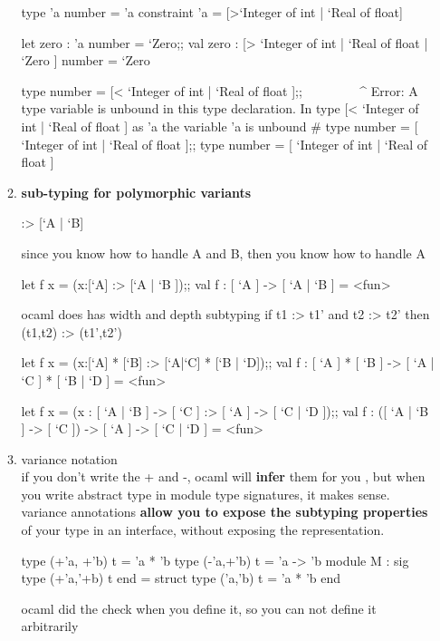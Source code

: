 \begin{enumerate}[(a)]
\begin{enumerate}
\begin{alternate}
type 'a number = 'a constraint 'a = [>`Integer of int | `Real of float]

let zero : 'a number = `Zero;;
val zero : [> `Integer of int | `Real of float | `Zero ] number = `Zero


type number = [< `Integer of int | `Real of float ];;
       ^^^^^^^^^^^^^^^^^^^^^^^^^^^^^^^^^^^^^^^^^^^^^^
Error: A type variable is unbound in this type declaration.
In type [< `Integer of int | `Real of float ] as 'a
the variable 'a is unbound
# type number = [ `Integer of int | `Real of float ];;
type number = [ `Integer of int | `Real of float ]


\end{alternate}

  \item \textbf{sub-typing for polymorphic variants}

\begin{bluecode}
  [`A] :> [`A | `B]
\end{bluecode}  
since you know how to handle A and B, then you know how to handle A

\begin{alternate}
let f x = (x:[`A] :> [`A | `B ]);;
val f : [ `A ] -> [ `A | `B ] = <fun>
\end{alternate}

ocaml does has width and depth subtyping
if t1 :> t1' and t2 :> t2' then (t1,t2) :> (t1',t2')

\begin{alternate}
let f x = (x:[`A] * [`B] :> [`A|`C] * [`B | `D]);; 
val f : [ `A ] * [ `B ] -> [ `A | `C ] * [ `B | `D ] = <fun>


let f x = (x : [ `A | `B ] -> [ `C ] :> [ `A ] -> [ `C | `D ]);;
val f : ([ `A | `B ] -> [ `C ]) -> [ `A ] -> [ `C | `D ] = <fun>
\end{alternate}

  \item variance notation \\
    if you don't write the + and -, ocaml will \textbf{infer} them for you ,
    but when you write abstract type in module type signatures, it makes sense.
    variance annotations \textbf{allow you to expose the subtyping properties} of your type
    in an interface, without exposing the representation.

\begin{redcode}
type (+'a, +'b) t = 'a * 'b
type (-'a,+'b) t = 'a -> 'b 
module M : sig
  type (+'a,'+b) t
end = struct
  type ('a,'b) t = 'a * 'b 
end
\end{redcode}
ocaml did the check when you define it, so you can not define it arbitrarily


\end{enumerate}
\end{enumerate}
